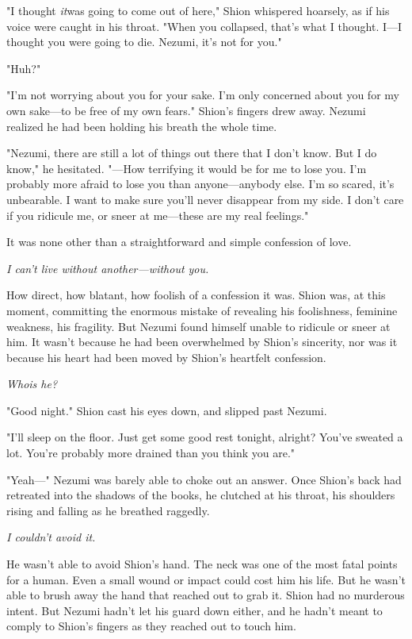 "I thought \emph{it}\el was going to come out of here," Shion whispered
hoarsely, as if his voice were caught in his throat. "When you
collapsed, that's what I thought. I---I thought you were going to die.
Nezumi, it's not for you."

"Huh?"

"I'm not worrying about you for your sake. I'm only concerned about you
for my own sake---to be free of my own fears." Shion's fingers drew away.
Nezumi realized he had been holding his breath the whole time.

"Nezumi, there are still a lot of things out there that I don't know.
But I do know," he hesitated. "---How terrifying it would be for me to
lose you. I'm probably more afraid to lose you than anyone---anybody else.
I'm so scared, it's unbearable. I want to make sure you'll never
disappear from my side. I don't care if you ridicule me, or sneer at
me---these are my real feelings."

It was none other than a straightforward and simple confession of love.

\emph{I can't live without another---without you.}

How direct, how blatant, how foolish of a confession it was. Shion was,
at this moment, committing the enormous mistake of revealing his
foolishness, feminine weakness, his fragility. But Nezumi found himself
unable to ridicule or sneer at him. It wasn't because he had been
overwhelmed by Shion's sincerity, nor was it because his heart had been
moved by Shion's heartfelt confession.

\emph{Who\el is he\el ?}

"Good night." Shion cast his eyes down, and slipped past Nezumi.

"I'll sleep on the floor. Just get some good rest tonight, alright?
You've sweated a lot. You're probably more drained than you think you
are."

"Yeah---" Nezumi was barely able to choke out an answer. Once Shion's back
had retreated into the shadows of the books, he clutched at his throat,
his shoulders rising and falling as he breathed raggedly.

\emph{I couldn't avoid it.}

He wasn't able to avoid Shion's hand. The neck was one of the most fatal
points for a human. Even a small wound or impact could cost him his
life. But he wasn't able to brush away the hand that reached out to grab
it. Shion had no murderous intent. But Nezumi hadn't let his guard down
either, and he hadn't meant to comply to Shion's fingers as they reached
out to touch him.

